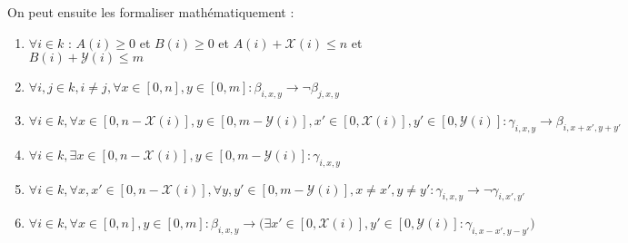 \documentclass[a4paper]{article}
\begin{document}
On peut ensuite les formaliser mathématiquement :
\begin{enumerate}
  \item $\forall i \in k$ : $A(i) \geq 0$ et $B(i) \geq 0$ et $A(i) + \mathcal{X}(i) \leq n$ et $B(i) + \mathcal{Y}(i)\leq m$

  \item $\forall i,j \in k, i \neq j, \forall x \in [0,n], y \in [0,m] : \beta_{i, x, y} \rightarrow \lnot \beta_{j, x, y}$

  \item $
  \forall i \in k,
  \forall x \in [0, n - \mathcal{X}(i)] , y \in [0, m - \mathcal{Y}(i)],
    x' \in [0, \mathcal{X}(i)], y' \in [0, \mathcal{Y}(i)] : \gamma_{i, x, y} \rightarrow \beta_{i, x+x', y+y'}
  $

  \item $\forall i \in k, \exists x \in  [0, n - \mathcal{X}(i)], y \in [0, m - \mathcal{Y}(i)] : \gamma_{i, x, y}$

  \item $
  \forall i \in k,
  \forall x,x' \in [0, n - \mathcal{X}(i)],
  \forall y,y' \in [0, m - \mathcal{Y}(i)],
  x \neq x', y \neq y' :
  \gamma_{i, x, y} \rightarrow \lnot \gamma_{i, x', y'}
  $

  \item $
  \forall i \in k, \forall x \in [0, n], y \in [0, m] : \beta_{i, x, y}
  \rightarrow
  \Big( \exists x' \in [0, \mathcal{X}(i)], y' \in [0, \mathcal{Y}(i)] :
  \gamma_{i, x-x', y-y'}
  \Big)
  $
\end{enumerate}
\end{document}
